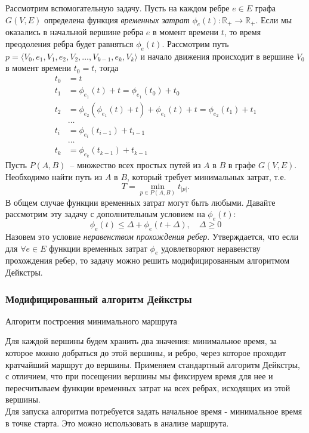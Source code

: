 \documentclass[12pt, a4paper]{article}
\begin{document}
Рассмотрим вспомогательную задачу. Пусть на каждом ребре $e \in E$ графа $G(V, E)$ определена функция \textit{временных затрат} $\phi_e(t) : \mathbb {R}_+ \rightarrow \mathbb {R}_+$. Если мы оказались в начальной вершине ребра $e$ в момент времени $t$, то время преодоления ребра будет равняться $\phi_e(t)$. Рассмотрим путь $p = \langle V_0, e_1, V_1, e_2, V_2, \dots, V_{k-1}, e_k, V_k \rangle $ и начало движения происходит в вершине $V_0$ в момент времени $t_0 = t$, тогда
\begin{align*}
t_0 & = t  \\
t_1 & = \phi_{e_1}(t) + t = \phi_{e_1}(t_0) + t_0  \\
t_2 & = \phi_{e_2}(\phi_{e_1}(t) + t) + \phi_{e_1}(t) + t = \phi_{e_2}(t_1) + t_1 \\
    & \dots \\
t_i & = \phi_{e_i}(t_{i-1}) + t_{i-1} \\
    & \dots \\
t_k & = \phi_{e_k}(t_{k-1}) + t_{k-1}
\end{align*}
Пусть $P(A, B)$~-- множество всех простых путей из $A$ в $B$ в графе $G(V, E)$. Необходимо найти путь из $A$ в $B$, который требует минимальных затрат, т.е. 
$$T = \min_{p \in P(A, B)} t_{|p|}.$$
В общем случае функции временных затрат могут быть любыми. Давайте рассмотрим эту задачу с дополнительным условием на $\phi_e(t):$
$$ \phi_e(t) \leq \Delta + \phi_e(t + \Delta), \quad \Delta \ge 0$$
Назовем это условие \textit{неравенством прохождения ребер}. Утверждается, что если для $\forall e \in E$ функции временных затрат $\phi_e$ удовлетворяют неравенству прохождения ребер, то задачу можно решить модифицированным алгоритмом Дейкстры.

\subsubsection{Модифицированный алгоритм Дейкстры}

$\textbf{Алгоритм построения минимального маршрута}$

Для каждой вершины будем хранить два значения: минимальное время, за которое можно добраться до этой вершины, и ребро, через которое проходит кратчайший маршрут до вершины.
Применяем стандартный алгоритм Дейкстры, с отличием, что при посещении вершины мы фиксируем время для нее и пересчитываем функции временных затрат на всех ребрах, исходящих из этой вершины.\\
Для запуска алгоритма потребуется задать начальное время - минимальное время в точке старта. Это можно использовать в анализе маршрута.
\end{document}
